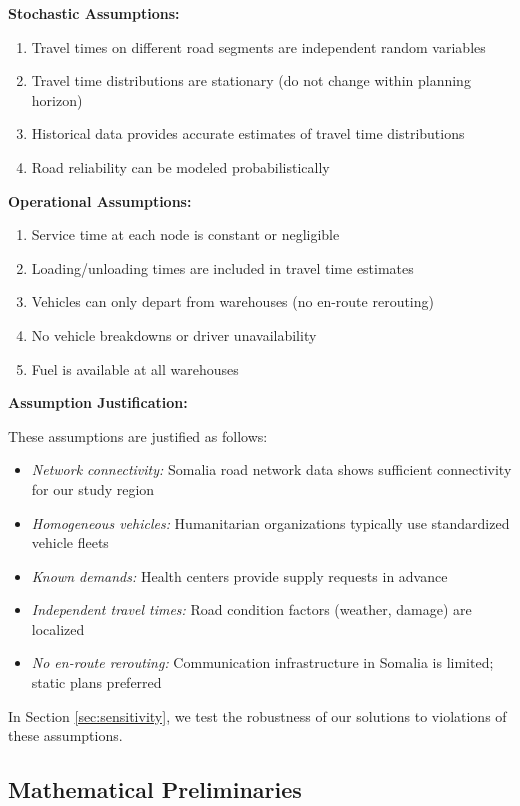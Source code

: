 \textbf{Stochastic Assumptions:}
\begin{enumerate}
\item Travel times on different road segments are independent random variables
\item Travel time distributions are stationary (do not change within planning horizon)
\item Historical data provides accurate estimates of travel time distributions
\item Road reliability can be modeled probabilistically
\end{enumerate}

\textbf{Operational Assumptions:}
\begin{enumerate}
\item Service time at each node is constant or negligible
\item Loading/unloading times are included in travel time estimates
\item Vehicles can only depart from warehouses (no en-route rerouting)
\item No vehicle breakdowns or driver unavailability
\item Fuel is available at all warehouses
\end{enumerate}

\textbf{Assumption Justification:}

These assumptions are justified as follows:
\begin{itemize}
\item \textit{Network connectivity:} Somalia road network data shows sufficient connectivity for our study region
\item \textit{Homogeneous vehicles:} Humanitarian organizations typically use standardized vehicle fleets
\item \textit{Known demands:} Health centers provide supply requests in advance
\item \textit{Independent travel times:} Road condition factors (weather, damage) are localized
\item \textit{No en-route rerouting:} Communication infrastructure in Somalia is limited; static plans preferred
\end{itemize}

In Section \ref{sec:sensitivity}, we test the robustness of our solutions to violations of these assumptions.

\subsection{Mathematical Preliminaries}

